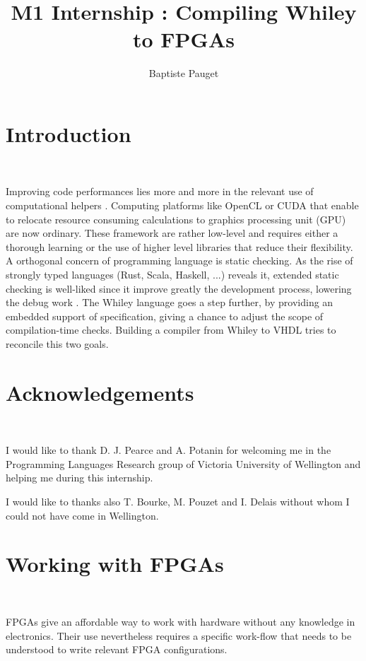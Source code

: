 \documentclass[10pt,a4paper]{article}
\author{Baptiste Pauget}
\title{\vspace{-1.6cm}M1 Internship : Compiling Whiley to FPGAs}
\renewcommand{\indent}{~\\\vspace{-.8cm}}
\begin{document}
	
	\setcounter{tocdepth}{2}
\maketitle
\section*{Introduction}\indent
{}

Improving code performances lies more and more in the relevant use of computational helpers \cite{nikolov2008systematic}. Computing platforms like OpenCL or CUDA that enable to relocate resource consuming calculations to graphics processing unit (GPU) are now ordinary. These framework are rather low-level and requires either a thorough learning or the use of higher level libraries that reduce their flexibility. A orthogonal concern of programming language is static checking. As the rise of strongly typed languages (Rust, Scala, Haskell, ...) reveals it, extended static checking is well-liked since it improve greatly the development process, lowering the debug work \cite{flanagan2013pldi}. 
The Whiley language goes a step further, by providing an embedded support of specification, giving a chance to adjust the scope of compilation-time checks. Building a compiler from Whiley to VHDL tries to reconcile this two goals.


\section*{Acknowledgements}\indent

I would like to thank D. J. Pearce and A. Potanin for welcoming me in the Programming Languages Research group of Victoria University of Wellington and helping me during this internship. 

I would like to thanks also T. Bourke, M. Pouzet and I. Delais without whom I could not have come in Wellington.

\tableofcontents


\newpage

\section{Working with FPGAs}\indent

FPGAs give an affordable way to work with hardware without any knowledge in electronics. Their use nevertheless requires a specific work-flow that needs to be understood to write relevant FPGA configurations.
\end{document}
